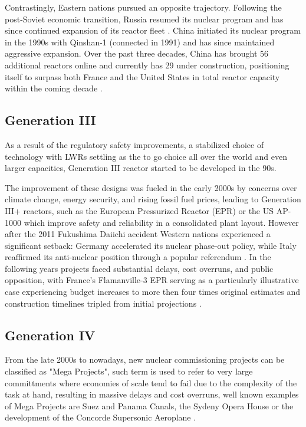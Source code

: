 Contrastingly, Eastern nations pursued an opposite trajectory. Following the post-Soviet economic transition, Russia resumed its nuclear program and has since continued expansion of its reactor fleet \cite{IAEA_PRIS_2025}. China initiated its nuclear program in the 1990s with Qinshan-1 (connected in 1991) and has since maintained aggressive expansion. Over the past three decades, China has brought 56 additional reactors online and currently has 29 under construction, positioning itself to surpass both France and the United States in total reactor capacity within the coming decade \cite{IAEA_PRIS_2025}.

\subsection{Generation III}
As a result of the regulatory safety improvements, a stabilized choice of technology with LWRs settling as the to go choice all over the world and even larger capacities, Generation III reactor started to be developed in the 90s.

The improvement of these designs was fueled in the early 2000s by concerns over climate change, energy security, and rising fossil fuel prices, leading to Generation III+ reactors, such as the European Pressurized Reactor (EPR) or the US AP-1000 which improve safety and reliability in a consolidated plant layout. However after the 2011 Fukushima Daiichi accident Western nations experienced a significant setback: Germany accelerated its nuclear phase-out policy, while Italy reaffirmed its anti-nuclear position through a popular referendum \cite{MinisteroInterno_Referendum_2011}. In the following years projects faced substantial delays, cost overruns, and public opposition, with France's Flamanville-3 EPR serving as a particularly illustrative case experiencing budget increases to more then four times original estimates and construction timelines tripled from initial projections \cite{nea2020unlocking}.

\subsection{Generation IV}
From the late 2000s to nowadays, new nuclear commissioning projects can be classified as "Mega Projects", such term is used to refer to very large committments where economies of scale tend to fail due to the complexity of the task at hand, resulting in massive delays and cost overruns, well known examples of Mega Projects are Suez and Panama Canals, the Sydeny Opera House or the development of the Concorde Supersonic Aeroplane \cite{Flyvbjerg2014, BROOKES201557}. 

